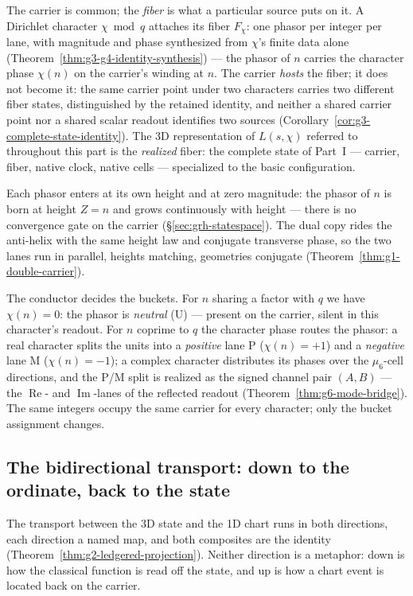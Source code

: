 The carrier is common; the \emph{fiber} is what a particular source puts on
it. A Dirichlet character \(\chi\bmod q\) attaches its fiber \(F_\chi\): one
phasor per integer per lane, with magnitude and phase synthesized from
\(\chi\)'s finite data alone
(Theorem~\ref{thm:g3-g4-identity-synthesis}) --- the phasor of \(n\) carries
the character phase \(\chi(n)\) on the carrier's winding at \(n\). The
carrier \emph{hosts} the fiber; it does not become it: the same carrier point
under two characters carries two different fiber states, distinguished by the
retained identity, and neither a shared carrier point nor a shared scalar
readout identifies two sources
(Corollary~\ref{cor:g3-complete-state-identity}). The 3D representation of
\(L(s,\chi)\) referred to throughout this part is the \emph{realized} fiber:
the complete state of Part~I --- carrier, fiber, native clock, native cells
--- specialized to the basic configuration.

Each phasor enters at its own height and at zero magnitude: the phasor of
\(n\) is born at height \(Z=n\) and grows continuously with height ---
there is no convergence gate on the carrier
(\S\ref{sec:grh-statespace}). The dual copy rides the anti-helix with the
same height law and conjugate transverse phase, so the two lanes run in
parallel, heights matching, geometries conjugate
(Theorem~\ref{thm:g1-double-carrier}).

The conductor decides the buckets. For \(n\) sharing a factor with \(q\) we
have \(\chi(n)=0\): the phasor is \emph{neutral} (U) --- present on the
carrier, silent in this character's readout. For \(n\) coprime to \(q\) the
character phase routes the phasor: a real character splits the units into a
\emph{positive} lane P (\(\chi(n)=+1\)) and a \emph{negative} lane M
(\(\chi(n)=-1\)); a complex character distributes its phases over the
\(\mu_6\)-cell directions, and the P/M split is realized as the signed channel
pair \((A,B)\) --- the \(\operatorname{Re}\)- and \(\operatorname{Im}\)-lanes
of the reflected readout (Theorem~\ref{thm:g6-mode-bridge}). The same integers
occupy the same carrier for every character; only the bucket assignment
changes. 

\subsection{The bidirectional transport: down to the ordinate, back to the
state}\label{sec:grh-projection}

The transport between the 3D state and the 1D chart runs in both directions,
each direction a named map, and both composites are the identity
(Theorem~\ref{thm:g2-ledgered-projection}). Neither direction is a metaphor:
down is how the classical function is read off the state, and up is how a
chart event is located back on the carrier.

